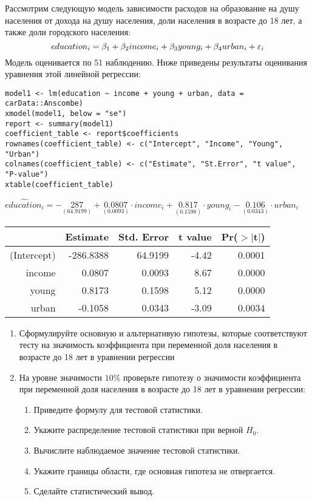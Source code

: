 \begin{problem}
Рассмотрим следующую модель зависимости расходов на образование на душу населения от дохода на душу населения, доли населения в возрасте до 18 лет, а также доли городского населения:
\[
education_i = \beta_1 + \beta_2 income_i + \beta_3 young_i + \beta_4 urban_i + \varepsilon_i
\]
Модель оценивается по 51 наблюдению.
Ниже приведены результаты оценивания уравнения этой линейной регрессии:

\begin{verbatim}
model1 <- lm(education ~ income + young + urban, data = carData::Anscombe)
xmodel(model1, below = "se")
report <- summary(model1)
coefficient_table <- report$coefficients
rownames(coefficient_table) <- c("Intercept", "Income", "Young", "Urban")
colnames(coefficient_table) <- c("Estimate", "St.Error", "t value", "P-value")
xtable(coefficient_table)
\end{verbatim}


\begin{center}
\ensuremath{\widehat{education}_i=-\underset{( 64.9199 )}{ 287 }+\underset{( 0.0093)}{0.0807}\cdot income_i+\underset{( 0.1598)}{0.817}\cdot young_i-\underset{( 0.0343)}{0.106}\cdot urban_i}

\begin{tabular}{rrrrr}
  \hline
 & Estimate & Std. Error & t value & Pr($>$$|$t$|$) \\
  \hline
(Intercept) & -286.8388 & 64.9199 & -4.42 & 0.0001 \\
  income & 0.0807 & 0.0093 & 8.67 & 0.0000 \\
  young & 0.8173 & 0.1598 & 5.12 & 0.0000 \\
  urban & -0.1058 & 0.0343 & -3.09 & 0.0034 \\
   \hline
\end{tabular}
\end{center}

\begin{enumerate}
\item Сформулируйте основную и альтернативую гипотезы, которые соответствуют тесту на значимость коэффициента при переменной доля населения в возрасте до 18 лет в уравнении регрессии
\item На уровне значимости $10\%$ проверьте гипотезу о значимости коэффициента при переменной доля населения в возрасте до 18 лет в уравнении регрессии:
\begin{enumerate}
\item Приведите формулу для тестовой статистики.
\item Укажите распределение тестовой статистики при верной $H_0$.
\item Вычислите наблюдаемое значение тестовой статистики.
\item Укажите границы области, где основная гипотеза не отвергается.
\item Сделайте статистический вывод.
\end{enumerate}



\end{enumerate}
\end{problem}
